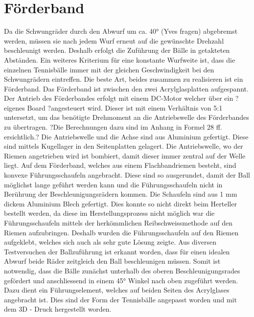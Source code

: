 \section{Förderband}
Da die Schwungräder durch den Abwurf um ca. 40° (Yves fragen) abgebremst werden, müssen sie nach jedem Wurf erneut auf die gewünschte Drehzahl beschleunigt werden. Deshalb erfolgt die Zuführung der Bälle in getakteten Abständen. Ein weiteres Kriterium für eine konstante Wurfweite ist, dass die einzelnen Tennisbälle immer mit der gleichen Geschwindigkeit bei den Schwungrädern eintreffen. Die beste Art, beides zusammen zu realisieren ist ein Förderband. Das Förderband ist zwischen den zwei Acrylglasplatten aufgespannt. Der Antrieb des Förderbandes erfolgt mit einem DC-Motor welcher über ein ?eigenes Board ?angesteuert wird. Dieser ist mit einem Verhältnis von  5:1 untersetzt, um das benötigte Drehmoment an die Antriebswelle des Förderbandes zu übertragen. ?Die Berechnungen dazu sind im Anhang in Formel 28 ff. ersichtlich.? Die Antriebswelle und die Achse sind aus Aluminium gefertigt. Diese sind mittels Kugellager in den Seitenplatten gelagert. Die Antriebswelle, wo der Riemen angetrieben wird ist bombiert, damit dieser immer zentral auf der Welle liegt. Auf dem Förderband, welches aus einem Flachbandriemen besteht, sind konvexe Führungsschaufeln angebracht. Diese sind so ausgerundet, damit der Ball möglichst lange geführt werden kann und die Führungsschaufeln nicht in Berührung der Beschleunigungsrädern kommen. Die Schaufeln sind aus 1 mm dickem Aluminium Blech gefertigt. Dies konnte so nicht direkt beim Herteller bestellt werden, da diese im Herstellungsprozess nicht möglich war die Führungsschaufeln mittels der herkömmlichen Reibschweissmethode auf den Riemen aufzubringen. Deshalb wurden die Führungsschaufeln auf den Riemen aufgeklebt, welches sich auch als sehr gute Lösung zeigte. Aus diversen Testversuchen der Ballzuführung ist erkannt worden, dass für einen idealen Abwurf beide Räder zeitgleich den Ball beschleunigen müssen. Somit ist notwendig, dass die Bälle zunächst unterhalb des oberen Beschleunigungsrades gefördert und anschliessend in einem 45° Winkel nach oben zugeführt werden. Dazu dient ein Führungselement, welches auf beiden Seiten des Acrylglases angebracht ist. Dies sind der Form der Tennisbälle angepasst worden und mit dem 3D - Druck hergestellt worden.

